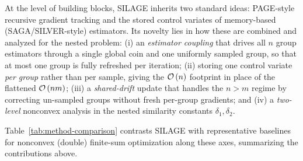 \documentclass{article}
\newcommand{\cO}{{\cal O}}
\newcommand{\rb}[1]{\left(#1\right)}
\theoremstyle{plain}
\newcommand{\algname}[1]{{\sf\scalefont{0.88}\color{mydarkgreen}#1}\xspace}
\def\algname#1{#1}%
\begin{document}
At the level of building blocks, \algname{SILAGE} inherits two standard ideas: \algname{PAGE}-style recursive gradient tracking and the stored control variates of memory-based (\algname{SAGA}/\algname{SILVER}-style) estimators. Its novelty lies in how these are combined and analyzed for the nested problem: (i) an \emph{estimator coupling} that drives all $n$ group estimators through a single global coin and one uniformly sampled group, so that at most one group is fully refreshed per iteration; (ii) storing one control variate \emph{per group} rather than per sample, giving the $\cO\rb{n}$ footprint in place of the flattened $\cO\rb{nm}$; (iii) a \emph{shared-drift} update that handles the $n>m$ regime by correcting un-sampled groups without fresh per-group gradients; and (iv) a \emph{two-level} nonconvex analysis in the nested similarity constants $\delta_1,\delta_2$.

Table~\ref{tab:method-comparison} contrasts \algname{SILAGE} with representative baselines for nonconvex (double) finite-sum optimization along these axes, summarizing the contributions above.
\end{document}
